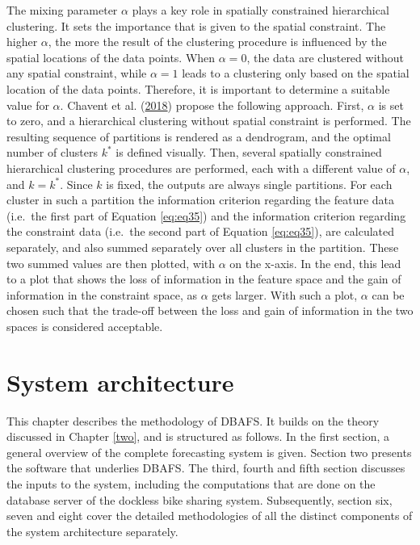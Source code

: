 \documentclass[12pt,oneside]{reedthesis}
\begin{document}
The mixing parameter \(\alpha\) plays a key role in spatially
constrained hierarchical clustering. It sets the importance that is
given to the spatial constraint. The higher \(\alpha\), the more the
result of the clustering procedure is influenced by the spatial
locations of the data points. When \(\alpha = 0\), the data are
clustered without any spatial constraint, while \(\alpha = 1\) leads to
a clustering only based on the spatial location of the data points.
Therefore, it is important to determine a suitable value for \(\alpha\).
Chavent et al. (\protect\hyperlink{ref-clustgeo}{2018}) propose the
following approach. First, \(\alpha\) is set to zero, and a hierarchical
clustering without spatial constraint is performed. The resulting
sequence of partitions is rendered as a dendrogram, and the optimal
number of clusters \(k^{*}\) is defined visually. Then, several
spatially constrained hierarchical clustering procedures are performed,
each with a different value of \(\alpha\), and \(k = k^{*}\). Since
\(k\) is fixed, the outputs are always single partitions. For each
cluster in such a partition the information criterion regarding the
feature data (i.e.~the first part of Equation \eqref{eq:eq35}) and the
information criterion regarding the constraint data (i.e.~the second
part of Equation \eqref{eq:eq35}), are calculated separately, and also
summed separately over all clusters in the partition. These two summed
values are then plotted, with \(\alpha\) on the x-axis. In the end, this
lead to a plot that shows the loss of information in the feature space
and the gain of information in the constraint space, as \(\alpha\) gets
larger. With such a plot, \(\alpha\) can be chosen such that the
trade-off between the loss and gain of information in the two spaces is
considered acceptable.

\chapter{System architecture}\label{three}

This chapter describes the methodology of DBAFS. It builds on the theory
discussed in Chapter \ref{two}, and is structured as follows. In the
first section, a general overview of the complete forecasting system is
given. Section two presents the software that underlies DBAFS. The
third, fourth and fifth section discusses the inputs to the system,
including the computations that are done on the database server of the
dockless bike sharing system. Subsequently, section six, seven and eight
cover the detailed methodologies of all the distinct components of the
system architecture separately.
\end{document}
